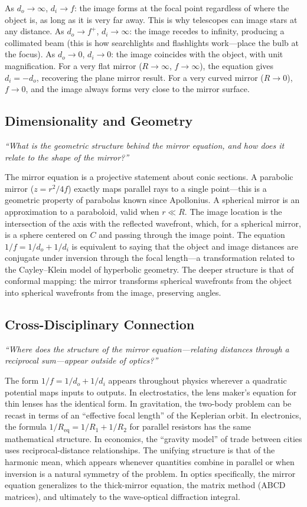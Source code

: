 \documentclass[11pt,openright]{book}
\begin{document}
As $d_{o} \to \infty$, $d_{i} \to f$: the image forms at the focal point regardless of where the object is, as long as it is very far away. This is why telescopes can image stars at any distance. As $d_{o} \to f^{+}$, $d_{i} \to \infty$: the image recedes to infinity, producing a collimated beam (this is how searchlights and flashlights work---place the bulb at the focus). As $d_{o} \to 0$, $d_{i} \to 0$: the image coincides with the object, with unit magnification. For a very flat mirror ($R \to \infty$, $f \to \infty$), the equation gives $d_{i} = -d_{o}$, recovering the plane mirror result. For a very curved mirror ($R \to 0$), $f \to 0$, and the image always forms very close to the mirror surface.

\subsection*{Dimensionality and Geometry}
\textit{``What is the geometric structure behind the mirror equation, and how does it relate to the shape of the mirror?''}

The mirror equation is a projective statement about conic sections. A parabolic mirror ($z = r^{2}/4f$) exactly maps parallel rays to a single point---this is a geometric property of parabolas known since Apollonius. A spherical mirror is an approximation to a paraboloid, valid when $r \ll R$. The image location is the intersection of the axis with the reflected wavefront, which, for a spherical mirror, is a sphere centered on $C$ and passing through the image point. The equation $1/f = 1/d_{o} + 1/d_{i}$ is equivalent to saying that the object and image distances are conjugate under inversion through the focal length---a transformation related to the Cayley--Klein model of hyperbolic geometry. The deeper structure is that of conformal mapping: the mirror transforms spherical wavefronts from the object into spherical wavefronts from the image, preserving angles.

\subsection*{Cross-Disciplinary Connection}
\textit{``Where does the structure of the mirror equation---relating distances through a reciprocal sum---appear outside of optics?''}

The form $1/f = 1/d_{o} + 1/d_{i}$ appears throughout physics wherever a quadratic potential maps inputs to outputs. In electrostatics, the lens maker's equation for thin lenses has the identical form. In gravitation, the two-body problem can be recast in terms of an ``effective focal length'' of the Keplerian orbit. In electronics, the formula $1/R_{\text{eq}} = 1/R_{1} + 1/R_{2}$ for parallel resistors has the same mathematical structure. In economics, the ``gravity model'' of trade between cities uses reciprocal-distance relationships. The unifying structure is that of the harmonic mean, which appears whenever quantities combine in parallel or when inversion is a natural symmetry of the problem. In optics specifically, the mirror equation generalizes to the thick-mirror equation, the matrix method (ABCD matrices), and ultimately to the wave-optical diffraction integral.
\end{document}
